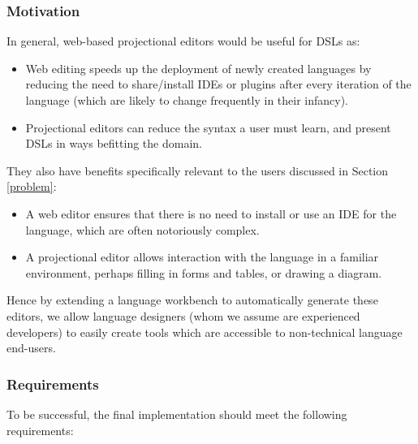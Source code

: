 \documentclass{article}
\begin{document}
\subsubsection{Motivation}\label{motivation}
In general, web-based projectional editors would be useful for DSLs as:
\begin{itemize}
\item Web editing speeds up the deployment of newly created languages by reducing the need to share/install IDEs or plugins after every iteration of the language (which are likely to change frequently in their infancy). 
\item Projectional editors can reduce the syntax a user must learn, and present DSLs in ways befitting the domain.
\end{itemize} 
They also have benefits specifically relevant to the users discussed in Section \ref{problem}:
\begin{itemize}
\item A web editor ensures that there is no need to install or use an IDE for the language, which are often notoriously complex. 
\item A projectional editor allows interaction with the language in a familiar environment, perhaps filling in forms and tables, or drawing a diagram.
\end{itemize}
Hence by extending a language workbench to automatically generate these editors, we allow language designers (whom we assume are experienced developers) to easily create tools which are accessible to non-technical language end-users.

\subsubsection{Requirements}\label{requirements}
To be successful, the final implementation should meet the following requirements: 
\end{document}
